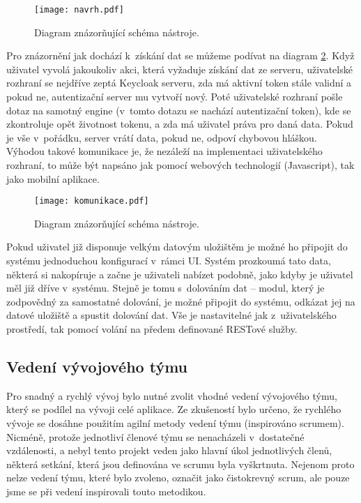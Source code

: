 \begin{figure}[!htp]
\centering
\texttt{[image: navrh.pdf]}
\caption{Diagram znázorňující schéma nástroje.}
\label{schema}
\end{figure}

\par Pro znázornění jak dochází k~získání dat se můžeme podívat na diagram \ref{komunikace}. Když uživatel vyvolá jakoukoliv akci, která vyžaduje získání dat ze serveru, uživatelské rozhraní se nejdříve zeptá Keycloak serveru, zda má aktivní token stále validní a pokud ne, autentizační server mu vytvoří nový. Poté uživatelské rozhraní pošle dotaz na samotný engine (v~tomto dotazu se nachází autentizační token), kde se zkontroluje opět životnost tokenu, a zda má uživatel práva pro daná data. Pokud je vše v~pořádku, server vrátí data, pokud ne, odpoví chybovou hláškou. Výhodou takové komunikace je, že nezáleží na implementaci uživatelského rozhraní, to může být napsáno jak pomocí webových technologií (Javascript), tak jako mobilní aplikace.

\begin{figure}[htp]
\centering
\texttt{[image: komunikace.pdf]}
\caption{Diagram znázorňující schéma nástroje.}
\label{komunikace}
\end{figure}

\par Pokud uživatel již disponuje velkým datovým uložištěm je možné ho připojit do systému jednoduchou konfigurací v~rámci UI. Systém prozkoumá tato data, některá si nakopíruje a začne je uživateli nabízet podobně, jako kdyby je uživatel měl již dříve v~systému. Stejně je tomu s~dolováním dat -- modul, který je zodpovědný za samostatné dolování, je možné připojit do systému, odkázat jej na datové uložiště a spustit dolování dat. Vše je nastavitelné jak z~uživatelského prostředí, tak pomocí volání na předem definované RESTové služby.
\newpage
\subsection{Vedení vývojového týmu}
\par Pro snadný a rychlý vývoj bylo nutné zvolit vhodné vedení vývojového týmu, který se podílel na vývoji celé aplikace. Ze zkušeností bylo určeno, že rychlého vývoje se dosáhne použitím agilní metody vedení týmu (inspirováno scrumem). Nicméně, protože jednotliví členové týmu se nenacházeli v~dostatečné vzdálenosti, a nebyl tento projekt veden jako hlavní úkol jednotlivých členů, některá setkání, která jsou definována ve scrumu byla vyškrtnuta. Nejenom proto nelze vedení týmu, které bylo zvoleno, označit jako čistokrevný scrum, ale pouze jsme se při vedení inspirovali touto metodikou.

